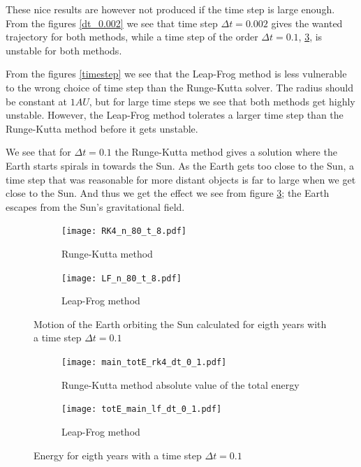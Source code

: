 \documentclass[a4paper,12pt, english]{article}
\begin{document}
These nice results are however not produced if the time step is large enough. From the figures \ref{dt_0.002} we see that time step $\Delta t = 0.002$ gives the wanted trajectory for both methods, while a time step of the order $\Delta t = 0.1$, \ref{dt0.1}, is unstable for both methods.

From the figures \ref{timestep} we see that the Leap-Frog method is less vulnerable to the wrong choice of time step than the Runge-Kutta solver. The radius should be constant at $1 AU$, but for large time steps we see that both methods get highly unstable. However, the Leap-Frog method tolerates a larger time step than the Runge-Kutta method before it gets unstable.


We see that for $\Delta t = 0.1$ the Runge-Kutta method gives a solution where the Earth starts spirals in towards the Sun. As the Earth gets too close to the Sun, a time step that was reasonable for more distant objects is far to large when we get close to the Sun. And thus we get the effect we see from figure \ref{dt0.1}; the Earth escapes from the Sun's gravitational field.

        
\begin{figure}[H]
        \centering
        \begin{subfigure}[b]{0.6\textwidth}
                \texttt{[image: RK4\_n\_80\_t\_8.pdf]}
                \caption{Runge-Kutta method}
                \label{fig:RK4_dt_0.1}
        \end{subfigure}%
        
        \begin{subfigure}[b]{0.6\textwidth}
                \texttt{[image: LF\_n\_80\_t\_8.pdf]}
                \caption{Leap-Frog method}
                \label{fig:LF_dt_0.1}
        \end{subfigure}
        \caption{Motion of the Earth orbiting the Sun calculated for eigth years with a time step $\Delta t = 0.1$}
\label{dt0.1}
\end{figure}

\begin{figure}[H]
        \centering
        \begin{subfigure}[b]{0.6\textwidth}
                \texttt{[image: main\_totE\_rk4\_dt\_0\_1.pdf]}
                \caption{Runge-Kutta method absolute value of the total energy}
                \label{fig:RK4_dt_0.1}
        \end{subfigure}
       
        \begin{subfigure}[b]{0.8\textwidth}
                \texttt{[image: totE\_main\_lf\_dt\_0\_1.pdf]}
                \caption{Leap-Frog method}
                \label{fig:LF_dt_0.1}
        \end{subfigure}
        \caption{Energy for eigth years with a time step $\Delta t = 0.1$}
    
\end{figure}
\end{document}
